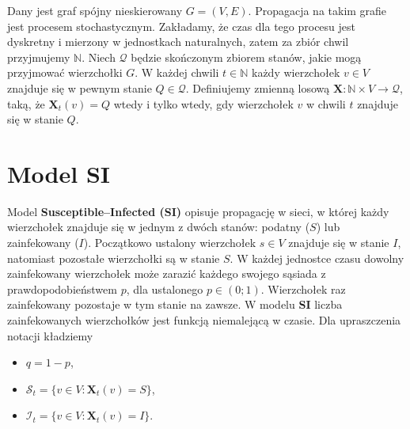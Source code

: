 

Dany jest graf spójny nieskierowany $G = (V, E)$. Propagacja na takim grafie jest procesem stochastycznym. Zakładamy, że czas dla tego procesu jest dyskretny i mierzony w jednostkach naturalnych, zatem za zbiór chwil przyjmujemy $\mathbb{N}$.  
Niech $\mathcal{Q}$ będzie skończonym zbiorem stanów, jakie mogą przyjmować wierzchołki $G$.  
W każdej chwili $t \in \mathbb{N}$ każdy wierzchołek $v \in V$ znajduje się w pewnym stanie $Q \in \mathcal{Q}$.  
Definiujemy zmienną losową $ \mathbf{X} : \mathbb{N}\times V \to \mathcal{Q} $,
taką, że $\mathbf{X}_t(v) = Q$ wtedy i tylko wtedy, gdy wierzchołek $v$ w chwili $t$ znajduje się w stanie $Q$.

\section{Model SI}

Model \textbf{Susceptible--Infected (SI)} opisuje propagację w sieci, w której każdy wierzchołek znajduje się w jednym z dwóch stanów: podatny ($S$) lub zainfekowany ($I$).  
Początkowo ustalony wierzchołek $s \in V$ znajduje się w stanie $I$, natomiast pozostałe wierzchołki są w stanie $S$.  
W każdej jednostce czasu dowolny zainfekowany wierzchołek może zarazić każdego swojego sąsiada z prawdopodobieństwem $p$, dla ustalonego $p \in (0;1)$.  
Wierzchołek raz zainfekowany pozostaje w tym stanie na zawsze.  
W modelu \textbf{SI} liczba zainfekowanych wierzchołków jest funkcją niemalejącą w czasie.
Dla upraszczenia notacji kładziemy 
\begin{itemize}
    \item $q=1-p$,
    \item $\mathcal{S}_t=\{v\in V: \mathbf{X}_t(v) = S\}$,
    \item $\mathcal{I}_t=\{v\in V: \mathbf{X}_t(v) = I\}$.
\end{itemize}

